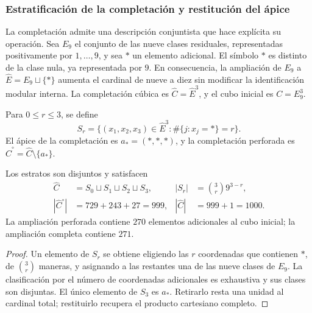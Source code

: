 \subsubsection{Estratificación de la completación y restitución del ápice}
\label{x_reciprocidad:sec:revision-emrh}

La completación admite una descripción conjuntista que hace explícita su
operación. Sea \(E_9\) el conjunto de las nueve clases residuales, representadas
positivamente por \(1,\ldots,9\), y sea \(\ast\) un elemento adicional.
El símbolo \(\ast\) es distinto de la clase nula, ya representada por \(9\).
En consecuencia, la ampliación de \(E_9\) a
\(\widehat E=E_9\sqcup\{\ast\}\) aumenta el cardinal de nueve a diez
sin modificar la identificación modular interna. La completación cúbica es
\(\widehat C=\widehat E^3\), y el cubo inicial es \(C=E_9^3\).

\begin{definition}
Para \(0\leq r\leq3\), se define
\[
 S_r=\{(x_1,x_2,x_3)\in\widehat E^3:
             \#\{j:x_j=\ast\}=r\}.
\]
El ápice de la completación es \(a_\ast=(\ast,\ast,\ast)\), y la
completación perforada es \(\widehat C^{\circ}=\widehat C\setminus\{a_\ast\}\).
\end{definition}

\begin{proposition}
Los estratos son disjuntos y satisfacen
\begin{align}
 \widehat C&=S_0\sqcup S_1\sqcup S_2\sqcup S_3,
 &|S_r|&=\binom3r9^{3-r},\label{x_reciprocidad:eq:revision-estratos}\\
 |\widehat C^{\circ}|&=729+243+27=999,
 &|\widehat C|&=999+1=1000.\label{x_reciprocidad:eq:revision-999}
\end{align}
La ampliación perforada contiene \(270\) elementos adicionales al cubo
inicial; la ampliación completa contiene \(271\).
\end{proposition}
\begin{proof}
Un elemento de \(S_r\) se obtiene eligiendo las \(r\) coordenadas que
contienen \(\ast\), de \(\binom3r\) maneras, y asignando a las restantes
una de las nueve clases de \(E_9\). La clasificación por el número de
coordenadas adicionales es exhaustiva y sus clases son disjuntas. El único
elemento de \(S_3\) es \(a_\ast\). Retirarlo resta una unidad al cardinal
total; restituirlo recupera el producto cartesiano completo.
\end{proof}

